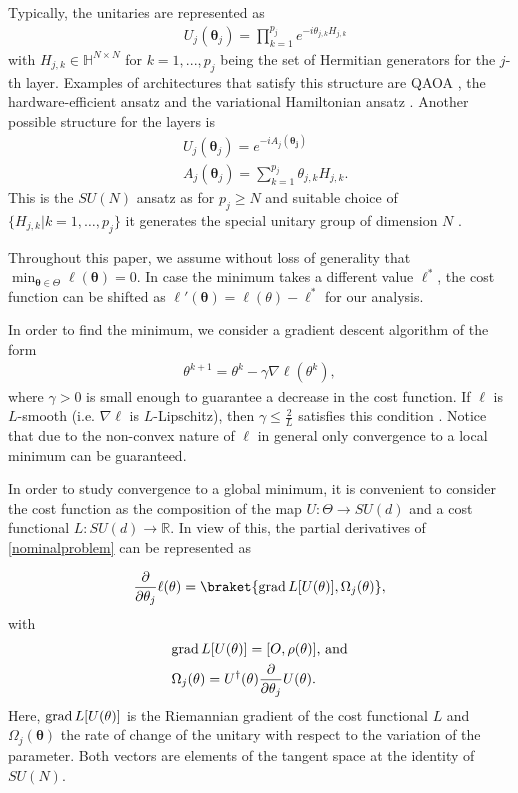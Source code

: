 \documentclass[letterpaper, 10 pt]{IEEEtran}  %
\newcommand{\grad}{\text{grad\,}}
\begin{document}
Typically, the unitaries are represented as 
\begin{align}
   & U_j(\mathbf{\theta}_j)=\prod_{k=1}^{p_j} e^{-i\theta_{j,k}H_{j,k}}
\end{align}
with $H_{j,k} \in \mathbb{H} ^{N \times N}$ for $k=1,..., p_j $ being the set of Hermitian generators for the $j$-th layer. Examples of architectures that satisfy this structure are QAOA \cite{Farhi2014}, the hardware-efficient ansatz \cite{Kandala2017} and the variational Hamiltonian ansatz \cite{Wiersema2020}.
Another possible structure for the layers is
\begin{align}
   & U_j(\mathbf{\theta}_j)=e^{-i A_j(\mathbf{\theta_j}) } \\
   & A_j(\mathbf{\theta}_j)=\sum_{k=1}^{p_j} \theta_{j,k} H_{j,k}.   
\end{align}
This is the $SU(N)$ ansatz as
for $p_j \geq N$ and suitable choice of $\{H_{j,k} | k=1,\dots, p_j\}$ it generates the special unitary group of dimension $N$ \cite{Wiersema2024}.

Throughout this paper, we assume without loss of generality that $\min_{\mathbf{\theta} \in \Theta} \ell (\mathbf{\theta})=0$. 
In case the minimum takes a different value $\ell^*$, the cost function can be shifted as $\ell'(\mathbf{\theta})=\ell(\theta)-\ell^*$ for our analysis. 

In order to find the minimum, we consider a gradient descent algorithm of the form
\begin{align}
   \theta^{k+1}=\theta^{k}-\gamma \nabla \ell(\theta^k), \label{gradientdescent}
\end{align}
where $\gamma>0$ is small enough to guarantee a decrease in the cost function. If $\ell$ is $L$-smooth (i.e. $\nabla \ell$ is $L$-Lipschitz), then $\gamma \le \frac{2}{L}$ satisfies this condition \cite{simonetto2025}. 
Notice that due to the non-convex nature of $\ell$ in general only convergence to a local minimum can be guaranteed.

In order to study convergence to a global minimum, it is convenient to consider the cost function as the composition of the map $U: \Theta \rightarrow SU(d)$ and a cost functional $L: SU(d) \rightarrow \mathbb{R}$.
In view of this, the partial derivatives of \eqref{nominalproblem} can be represented as \cite{Wiedmann2025}

\begin{align}
   \dfrac{\partial}{\partial \theta_j} \ell(\theta)=\braket{\grad L [U (\mathbf{\theta})], \Omega_j (\mathbf{\theta})},
\end{align}
with 
\begin{align}
   & \grad L[U(\theta)]=[O, \rho(\mathbf{\theta})] \text{, and}\\
   & \Omega_j(\mathbf{\theta})= U^\dagger(\mathbf{\theta}) \dfrac{\partial}{\partial \theta_j} U(\mathbf{\theta}).
\end{align}
Here, $\grad L[U(\mathbf{\theta})]$ is the Riemannian gradient of the cost functional $L$ and $\Omega_j(\mathbf{\theta})$ the rate of change of the unitary with respect to the variation of the parameter. 
Both vectors are elements of the tangent space at the identity of $SU(N)$.
\end{document}
